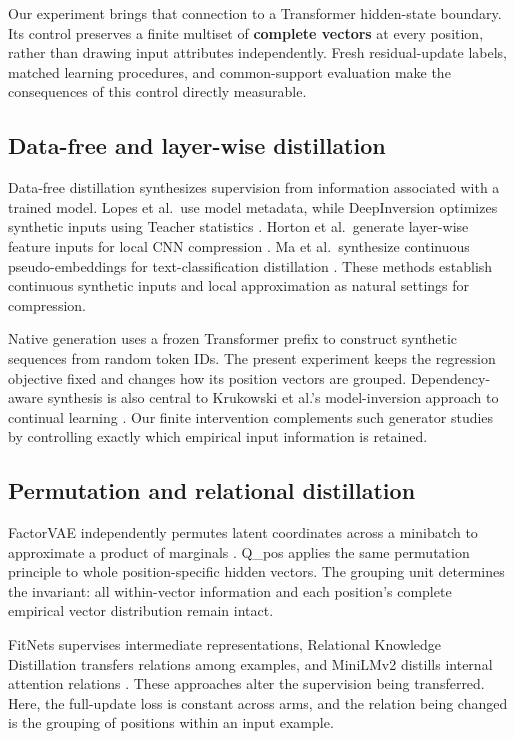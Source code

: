 Our experiment brings that connection to a Transformer hidden-state boundary. Its control preserves a finite multiset of \textbf{complete vectors} at every position, rather than drawing input attributes independently. Fresh residual-update labels, matched learning procedures, and common-support evaluation make the consequences of this control directly measurable.

\subsection{Data-free and layer-wise distillation}\label{data-free-and-layer-wise-distillation}

Data-free distillation synthesizes supervision from information associated with a trained model. Lopes et al.~use model metadata, while DeepInversion optimizes synthetic inputs using Teacher statistics \citep{lopes2017datafree, yin2020deepinversion}. Horton et al.~generate layer-wise feature inputs for local CNN compression \citep{horton2022layerwise}. Ma et al.~synthesize continuous pseudo-embeddings for text-classification distillation \citep{ma2020asdfd}. These methods establish continuous synthetic inputs and local approximation as natural settings for compression.

Native generation uses a frozen Transformer prefix to construct synthetic sequences from random token IDs. The present experiment keeps the regression objective fixed and changes how its position vectors are grouped. Dependency-aware synthesis is also central to Krukowski et al.'s model-inversion approach to continual learning \citep{krukowski2026dreams}. Our finite intervention complements such generator studies by controlling exactly which empirical input information is retained.

\subsection{Permutation and relational distillation}\label{permutation-and-relational-distillation}

FactorVAE independently permutes latent coordinates across a minibatch to approximate a product of marginals \citep{kim2018factorvae}. Q\_pos applies the same permutation principle to whole position-specific hidden vectors. The grouping unit determines the invariant: all within-vector information and each position's complete empirical vector distribution remain intact.

FitNets supervises intermediate representations, Relational Knowledge Distillation transfers relations among examples, and MiniLMv2 distills internal attention relations \citep{romero2015fitnets, park2019rkd, wang2021minilmv2}. These approaches alter the supervision being transferred. Here, the full-update loss is constant across arms, and the relation being changed is the grouping of positions within an input example.

